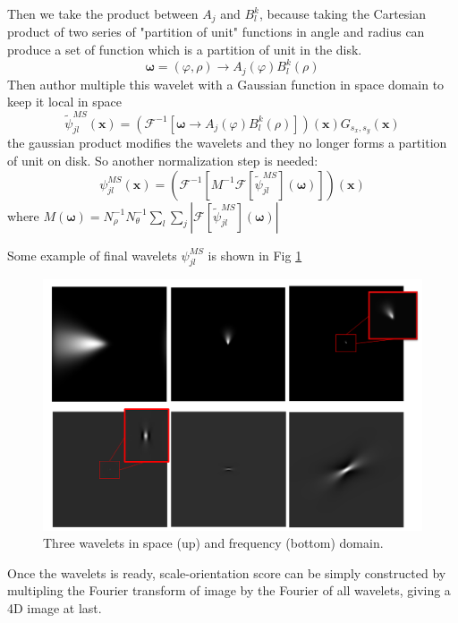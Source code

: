 \documentclass{article}
\begin{document}
	Then we take the product between $A_j$ and $B_l^k$, because taking the Cartesian product of two series of "partition of unit" functions in angle and radius can produce a set of function which is a partition of unit in the disk.
	\begin{equation}
	\boldsymbol{\omega}=(\varphi,\rho) \rightarrow A_j(\varphi) B_l^k(\rho)
	\end{equation}
	Then author multiple this wavelet with a Gaussian function in space domain to keep it local in space
	\begin{equation}
	\tilde{\psi}^{MS}_{jl}(\mathbf{x}) = (\mathcal{F}^{-1}[\boldsymbol{\omega}\rightarrow A_j(\varphi) B_l^k(\rho)])(\mathbf{x})G_{s_x,s_y}(\mathbf{x})
	\end{equation}
	the gaussian product modifies the wavelets and they no longer forms a partition of unit on disk. So another normalization step is needed:
	\begin{equation}
	\psi^{MS}_{jl}(\mathbf{x}) = (\mathcal{F}^{-1}[M^{-1}\mathcal{F}[\tilde{\psi}^{MS}_{jl}](\boldsymbol{\omega})])(\mathbf{x})
	\end{equation}
	where $M(\boldsymbol{\omega}) = N_\rho^{-1} N_\theta^{-1} \sum_{l}\sum_{j} |\mathcal{F}[\tilde{\psi}^{MS}_{jl}](\boldsymbol{\omega})|$
	
	Some example of final wavelets $\psi^{MS}_{jl}$ is shown in Fig \ref{fig:wavelet}
	\begin{figure}[h]
		\centering
		\includegraphics[width=12cm]{wavelets.png}
		\caption{Three wavelets in space (up) and frequency (bottom) domain.}
		\label{fig:wavelet}
	\end{figure}

	Once the wavelets is ready, scale-orientation score can be simply constructed by multipling the Fourier transform of image by the Fourier of all wavelets, giving a 4D image at last.
\end{document}
